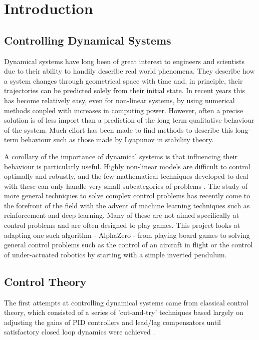 \documentclass[main.tex]{subfiles}
\begin{document}
\chapter{Introduction}

\section{Controlling Dynamical Systems}
Dynamical systems have long been of great interest to engineers and scientists due to their ability to handily describe real world phenomena. They describe how a system changes through geometrical space with time and, in principle, their trajectories can be predicted solely from their initial state. In recent years this has become relatively easy, even for non-linear systems, by using numerical methods coupled with increases in computing power. However, often a precise solution is of less import than a prediction of the long term qualitative behaviour of the system. Much effort has been made to find methods to describe this long-term behaviour such as those made by Lyapunov in stability theory. 

A corollary of the importance of dynamical systems is that influencing their behaviour is particularly useful. Highly non-linear models are difficult to control optimally and robustly, and the few mathematical techniques developed to deal with these can only handle very small subcategories of problems \cite{4f2, 4f3}. The study of more general techniques to solve complex control problems has recently come to the forefront of the field with the advent of machine learning techniques such as reinforcement and deep learning. Many of these are not aimed specifically at control problems and are often designed to play games. This project looks at adapting one such algorithm - AlphaZero - from playing board games to solving general control problems such as the control of an aircraft in flight or the control of under-actuated robotics by starting with a simple inverted pendulum.

\section{Control Theory}
The first attempts at controlling dynamical systems came from classical control theory, which consisted of a series of 'cut-and-try' techniques based largely on adjusting the gains of PID controllers and lead/lag compensators until satisfactory closed loop dynamics were achieved \cite{History}.
\end{document}
